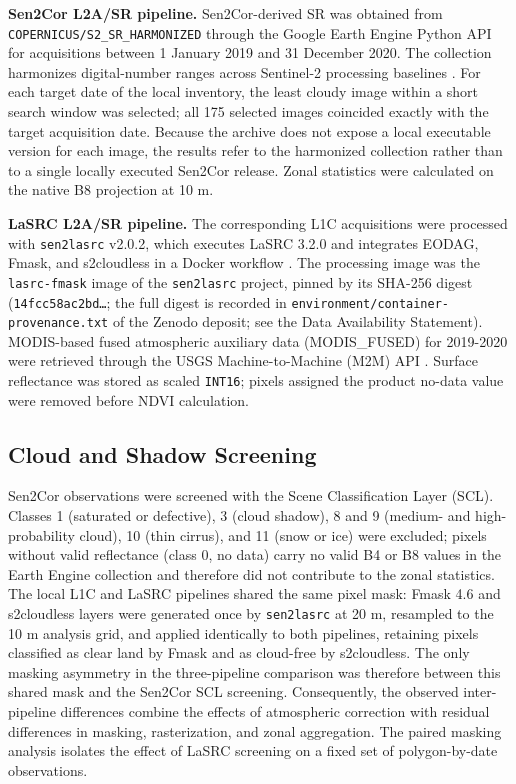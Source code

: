 \documentclass[remotesensing,article,submit,pdftex,oneauthor]{Definitions/mdpi}
\begin{document}
\textbf{Sen2Cor L2A/SR pipeline.} Sen2Cor-derived SR was obtained from
\texttt{COPERNICUS/S2\_SR\_HARMONIZED} through the Google Earth Engine
Python API for acquisitions between 1 January 2019 and 31 December 2020.
The collection harmonizes digital-number ranges across Sentinel-2
processing baselines \citep{GEE2026S2SR}. For each target date of the
local inventory, the least cloudy image within a short search window was
selected; all 175 selected images coincided exactly with the target
acquisition date. Because the archive does not expose a local executable
version for each image, the results refer to the harmonized collection
rather than to a single locally executed Sen2Cor release. Zonal
statistics were calculated on the native B8 projection at 10 m.

\textbf{LaSRC L2A/SR pipeline.} The corresponding L1C acquisitions were
processed with \texttt{sen2lasrc} v2.0.2, which executes LaSRC 3.2.0 and
integrates EODAG, Fmask, and s2cloudless in a Docker workflow
\citep{deBoissieu2024, Qiu2019, SentinelHubS2Cloudless}. The processing
image was the \texttt{lasrc-fmask} image of the \texttt{sen2lasrc}
project, pinned by its SHA-256 digest (\texttt{14fcc58ac2bd…}; the full
digest is recorded in \texttt{environment/container-provenance.txt} of
the Zenodo deposit; see the Data Availability Statement). MODIS-based
fused atmospheric auxiliary data (MODIS\_FUSED) for 2019-2020 were
retrieved through the USGS Machine-to-Machine (M2M) API
\citep{USGS2026M2M}. Surface reflectance was stored as scaled
\texttt{INT16}; pixels assigned the product no-data value were removed
before NDVI calculation.

\subsection{Cloud and Shadow Screening}\label{sec-masks}

Sen2Cor observations were screened with the Scene Classification Layer
(SCL). Classes 1 (saturated or defective), 3 (cloud shadow), 8 and 9
(medium- and high-probability cloud), 10 (thin cirrus), and 11 (snow or
ice) were excluded; pixels without valid reflectance (class 0, no data)
carry no valid B4 or B8 values in the Earth Engine collection and
therefore did not contribute to the zonal statistics. The local L1C and
LaSRC pipelines shared the same pixel mask: Fmask 4.6 and s2cloudless
layers were generated once by \texttt{sen2lasrc} at 20 m, resampled to
the 10 m analysis grid, and applied identically to both pipelines,
retaining pixels classified as clear land by Fmask and as cloud-free by
s2cloudless. The only masking asymmetry in the three-pipeline comparison
was therefore between this shared mask and the Sen2Cor SCL screening.
Consequently, the observed inter-pipeline differences combine the
effects of atmospheric correction with residual differences in masking,
rasterization, and zonal aggregation. The paired masking analysis
isolates the effect of LaSRC screening on a fixed set of polygon-by-date
observations.
\end{document}
